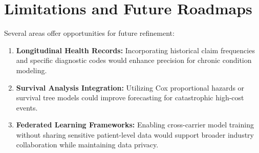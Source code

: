 \documentclass[12pt,a4paper]{report}
\begin{document}
\section{Limitations and Future Roadmaps}
Several areas offer opportunities for future refinement:
\begin{enumerate}
    \item \textbf{Longitudinal Health Records:} Incorporating historical claim frequencies and specific diagnostic codes would enhance precision for chronic condition modeling.
    \item \textbf{Survival Analysis Integration:} Utilizing Cox proportional hazards or survival tree models could improve forecasting for catastrophic high-cost events.
    \item \textbf{Federated Learning Frameworks:} Enabling cross-carrier model training without sharing sensitive patient-level data would support broader industry collaboration while maintaining data privacy.
\end{enumerate}
\end{document}
